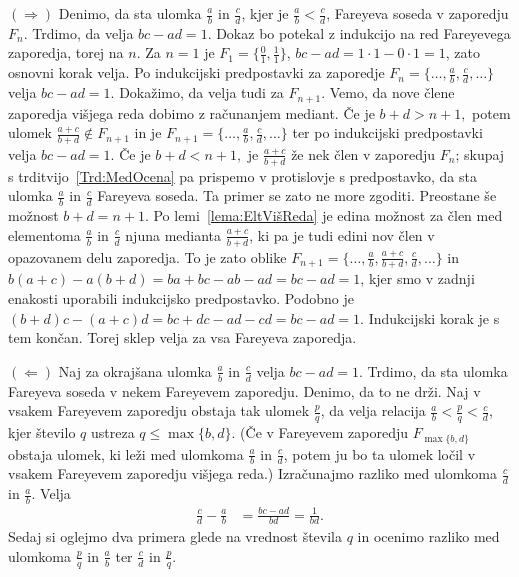 \documentclass[mat1]{fmfdelo}
\begin{document}
\begin{dokaz}
$(\Rightarrow)$ 
Denimo, da sta ulomka $\frac{a}{b}$ in $\frac{c}{d}$, kjer je $\frac{a}{b} < \frac{c}{d}$, Fareyeva soseda v zaporedju $F_{n}$. Trdimo, da velja $bc - ad = 1$. Dokaz bo potekal z indukcijo na red Fareyevega zaporedja, torej na $n$.
Za $n=1$ je $F_1 = \{\frac{0}{1}, \frac{1}{1}\}$, $bc - ad = 1\cdot1 - 0\cdot1 = 1$, zato osnovni korak velja.
Po indukcijski predpostavki za zaporedje \( F_n = \{\ldots , \frac{a}{b}, \frac{c}{d} , \ldots \} \) velja $bc - ad = 1$. Dokažimo, da velja tudi za $F_{n+1}$. Vemo, da nove člene zaporedja višjega reda dobimo z računanjem mediant. Če je $b+d > n+1,$ potem ulomek $\frac{a+c}{b+d} \notin F_{n+1}$ in je \( F_{n+1} = \{\ldots , \frac{a}{b}, \frac{c}{d} , \ldots \} \) ter po indukcijski predpostavki velja $bc - ad = 1$. 
Če je $b+d < n+1,$ je $\frac{a+c}{b+d}$ že nek člen v zaporedju $F_n$; skupaj s trditvijo~\ref{Trd:MedOcena} pa prispemo v protislovje s predpostavko, da sta ulomka $\frac{a}{b}$ in $\frac{c}{d}$ Fareyeva soseda. Ta primer se zato ne more zgoditi. 
Preostane še možnost $b+d = n+1$. Po lemi~\ref{lema:EltVišReda} je edina možnost za člen med elementoma $\frac{a}{b}$ in $\frac{c}{d}$ njuna medianta $\frac{a+c}{b+d}$, ki pa je tudi edini nov člen v opazovanem delu zaporedja. To je zato oblike \( F_{n+1} = \{\ldots , \frac{a}{b}, \frac{a+c}{b+d}, \frac{c}{d} , \ldots \} \) in $b(a + c) - a(b + d) = ba + bc - ab - ad = bc - ad = 1$, kjer smo v zadnji enakosti uporabili indukcijsko predpostavko. Podobno je $(b + d)c - (a + c)d = bc + dc - ad - cd = bc - ad = 1$. Indukcijski korak je s tem končan. Torej sklep velja za vsa Fareyeva zaporedja.

$(\Leftarrow)$ 
Naj za okrajšana ulomka $\frac{a}{b}$ in $\frac{c}{d}$ velja $bc-ad=1$. Trdimo, da sta ulomka Fareyeva soseda v nekem Fareyevem zaporedju. 
Denimo, da to ne drži. Naj v vsakem Fareyevem zaporedju obstaja tak ulomek $\frac{p}{q}$, da velja relacija $\frac{a}{b} <\frac{p}{q} < \frac{c}{d}$, kjer število $q$ ustreza $q \leq \max \{ b,d \}$. (Če v Fareyevem zaporedju $F_{\max \{b,d \}}$ obstaja ulomek, ki leži med ulomkoma $\frac{a}{b}$ in $\frac{c}{d}$, potem ju bo ta ulomek ločil v vsakem Fareyevem zaporedju višjega reda.)
Izračunajmo razliko med ulomkoma $\frac{c}{d}$ in $\frac{a}{b}$. Velja
\begin{align}
\label{Eq:LastFarSos}
\frac{c}{d} - \frac{a}{b} &= \frac{bc-ad}{bd} = \frac{1}{bd}.
\end{align}
Sedaj si oglejmo dva primera glede na vrednost števila $q$ in ocenimo razliko med ulomkoma $\frac{p}{q}$ in $\frac{a}{b}$ ter $\frac{c}{d}$ in $\frac{p}{q}$.


\end{dokaz}
\end{document}
